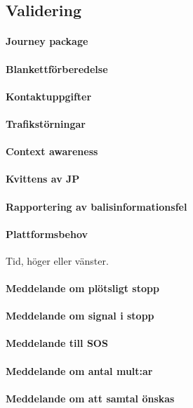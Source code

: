 \subsection{Validering}
\paragraph{Journey package}
\paragraph{Blankettförberedelse}
\paragraph{Kontaktuppgifter}
\paragraph{Trafikstörningar}
\paragraph{Context awareness}
\paragraph{Kvittens av JP}
\paragraph{Rapportering av balisinformationsfel}
\paragraph{Plattformsbehov}
Tid, höger eller vänster.
\paragraph{Meddelande om plötsligt stopp}
\paragraph{Meddelande om signal i stopp}
\paragraph{Meddelande till SOS}
\paragraph{Meddelande om antal mult:ar}
\paragraph{Meddelande om att samtal önskas}
